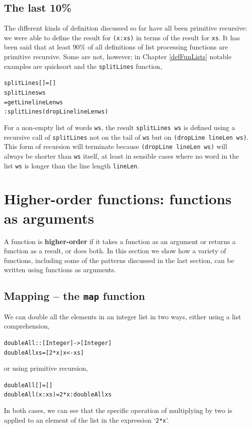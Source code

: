 \subsection*{The last 10\%}

The different kinds of definition discussed so far have all been primitive
recursive: we were able to define the result for \texttt{(x:xs)} in terms of the
result for \texttt{xs}. It has been said that at least 90\% of all definitions of
list processing functions are primitive recursive. Some are not, however; in
Chapter \ref{defFunLists} notable examples are quicksort and the \texttt{splitLines}
function,
\begin{alltt}
splitLines [] = []
splitLines ws
  = getLine lineLen ws
         : splitLines (dropLine lineLen ws)
\end{alltt}
For a non-empty list of words \texttt{ws}, the result \texttt{splitLines ws} is defined using
a recursive call of \texttt{splitLines} not on the tail of \texttt{ws} but on 
\texttt{(dropLine lineLen ws)}.
This form of recursion will terminate
because \texttt{(dropLine lineLen ws)} will always be shorter than \texttt{ws} itself,
at least in sensible cases where no word in the list \texttt{ws} is longer than the line
length \texttt{lineLen}.  



\section{Higher-order functions: functions as arguments}
\label{hofs}

A function is \textbf{higher-order} if it takes a function as an
argument or returns a function as a result, or does both. In this section we
show how a variety of functions, including some of the patterns
discussed in the last section, can be written using functions as
arguments.

\subsection*{Mapping -- the \texttt{map} function}

We can double all the elements in an integer list in two ways, either
using a list comprehension,
\begin{alltt}
doubleAll :: [Integer] -> [Integer]
doubleAll xs = [ 2*x | x <- xs ]
\end{alltt}
or using primitive recursion,
\begin{alltt}
doubleAll []     = []
doubleAll (x:xs) = 2*x : doubleAll xs
\end{alltt}
In both cases, we can see that the specific operation of multiplying
by two is applied to an element of the list in the expression `\texttt{2*x}'. 

